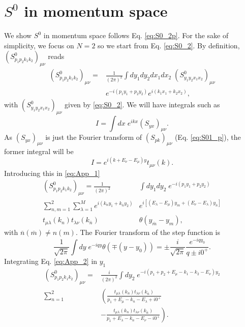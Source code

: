 \documentclass[notitlepage, prx, preprint, amsmath,superscriptaddress,amssymb]{revtex4-1}
\begin{document}
\section{$S^0$ in momentum space}\label{app:Sp}

We show $S^0$ in momentum space follows Eq. \eqref{eq:S0_2p}. For the sake of simplicity, we focus on $N=2$ so we start from Eq. \eqref{eq:S0_2}. By definition, $(S^0_{p_1p_2k_1k_2})_{\mu\nu}$ reads
\begin{align}\label{eq:App_1}
(S_{p_1p_2k_1k_2}^0)_{\mu\nu}=&\frac{1}{(2\pi)^2}\int  dy_1dy_2dx_1dx_2\; (S_{y_1y_2x_1x_2}^0)_{\mu\nu}\nonumber\\
& e^{-i(p_1y_1+p_2y_2)}  e^{i(k_1x_1+k_2x_2)},
\end{align}
with $(S_{y_1y_2x_1x_2}^0)_{\mu\nu}$ given by \eqref{eq:S0_2}. We will have integrals such as
\begin{equation}
I=\int dx\; e^{ikx}(S_{yx})_{\mu\nu}.
\end{equation}
As $(S_{yx})_{\mu\nu}$ is just the Fourier transform of $(S_{pk})_{\mu\nu}$ (Eq. \eqref{eq:S01_p}), the former integral will be
\begin{equation}
I=e^{i(k+E_\nu-E_\mu)y}t_{\mu\nu}(k).
\end{equation}
Introducing this in \eqref{eq:App_1}
\begin{align}\label{eq:App_2}
(S_{p_1p_2k_1k_2}^0)_{\mu\nu}=\frac{1}{(2\pi)^2} &\int dy_1 dy_2\; e^{-i(p_1y_1+p_2y_2)}\nonumber\\
\sum_{n,m=1}^2 \sum_{\lambda=1}^M e^{i(k_ny_1 + k_{\overline{n}} y_2)}& e^{i[(E_\lambda-E_\mu)y_m+(E_\nu-E_\lambda)y_{\overline{n}}]} \nonumber\\
t_{\mu\lambda}(k_n)t_{\lambda\nu}(k_{\overline{n}})& \theta(y_{\overline{m}}-y_m),
\end{align}
with $\overline{n}(\overline{m})\neq n(m)$. The Fourier transform of the step function is
\begin{equation}
\frac{1}{\sqrt{2\pi}}\int dy \; e^{-iqy}\theta(\mp(y-y_0))=\pm\frac{i}{\sqrt{2\pi}}\frac{e^{-iqy_0}}{q\pm i0^+}.
\end{equation}
Integrating Eq. \eqref{eq:App_2} in $y_1$
\begin{align}
(S_{p_1p_2k_1k_2}^0)_{\mu\nu}=&\frac{i}{(2\pi)^2} \int dy_2\; e^{-i(p_1+p_2+E_\mu-k_1-k_2-E_\nu)y_2} \nonumber\\
\sum_{n=1}^2 & \left( \frac{t_{\mu\lambda}(k_n)t_{\lambda\nu}(k_{\overline{n}})}{p_1+E_\mu-k_n-E_\lambda+i0^+} \right. \nonumber\\
&\left. -\frac{t_{\mu\lambda}(k_n)t_{\lambda\nu}(k_{\overline{n}})}{p_1+E_\lambda-k_n-E_\nu-i0^+}\right).
\end{align}
\end{document}
